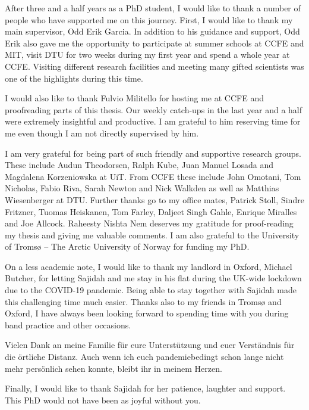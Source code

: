 After three and a half years as a PhD student, I would like to thank a number of people who have supported me on this journey. First, I would like to thank my main supervisor, Odd Erik Garcia.  In addition to his guidance and support, Odd Erik also gave me the opportunity to participate at summer schools at CCFE and MIT, visit DTU for two weeks during my first year and spend a whole year at CCFE. Visiting different research facilities and meeting many gifted scientists was one of the highlights during this time. 

I would also like to thank Fulvio Militello for hosting me at CCFE and proofreading parts of this thesis. Our weekly catch-ups in the last year and a half were extremely insightful and productive. I am grateful to him reserving time for me even though I am not directly supervised by him.

I am very grateful for being part of such friendly and supportive research groups. These include Audun Theodorsen, Ralph Kube, Juan Manuel Losada and Magdalena Korzeniowska at UiT. From CCFE these include John Omotani, Tom Nicholas, Fabio Riva, Sarah Newton and Nick Walkden as well as Matthias Wiesenberger at DTU. Further thanks go to my office mates, Patrick Stoll, Sindre Fritzner, Tuomas Heiskanen, Tom Farley, Daljeet Singh Gahle, Enrique Miralles and Joe Allcock. Raheesty Nishta Nem deserves my gratitude for proof-reading my thesis and giving me valuable comments. I am also grateful to the University of Tromsø – The Arctic University of Norway for funding my PhD. 

On a less academic note, I would like to thank my landlord in Oxford, Michael Butcher, for letting Sajidah and me stay in his flat during the UK-wide lockdown due to the COVID-19 pandemic. Being able to stay together with Sajidah made this challenging time much easier. Thanks also to my friends in Tromsø and Oxford, I have always been looking forward to spending time with you during band practice and other occasions.

Vielen Dank an meine Familie für eure Unterstützung und euer Verständnis für die örtliche Distanz. Auch wenn ich euch pandemiebedingt schon lange nicht mehr persönlich sehen konnte, bleibt ihr in meinem Herzen.

Finally, I would like to thank Sajidah for her patience, laughter and support. This PhD would not have been as joyful without you.